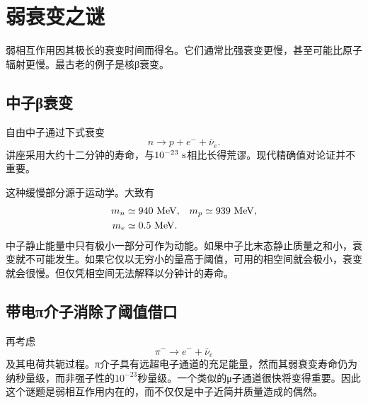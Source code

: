 \begin{classroomqa}
\end{classroomqa}

\begin{classroomqa}
\end{classroomqa}

\section{弱衰变之谜}

弱相互作用因其极长的衰变时间而得名。它们通常比强衰变更慢，甚至可能比原子辐射更慢。最古老的例子是核{\proseunicodefont β}衰变。

\subsection{中子{\proseunicodefont β}衰变}

自由中子通过下式衰变
\begin{equation}
n\longrightarrow p+e^-+\bar\nu_e.
\label{eq:l5-neutron-decay-intro}
\end{equation}
讲座采用大约十二分钟的寿命，与\(10^{-23}\ {\rm s}\)相比长得荒谬。现代精确值对论证并不重要。

这种缓慢部分源于运动学。大致有
\begin{equation}
\begin{aligned}
m_n&\simeq940\ {\rm MeV},
&
m_p&\simeq939\ {\rm MeV},
\\
m_e&\simeq0.5\ {\rm MeV}.
\end{aligned}
\end{equation}
中子静止能量中只有极小一部分可作为动能。如果中子比末态静止质量之和小，衰变就不可能发生。如果它仅以无穷小的量高于阈值，可用的相空间就会极小，衰变就会很慢。但仅凭相空间无法解释以分钟计的寿命。

\subsection{带电{\proseunicodefont π}介子消除了阈值借口}

再考虑
\begin{equation}
\pi^-\longrightarrow e^-+\bar\nu_e
\end{equation}
及其电荷共轭过程。{\proseunicodefont π}介子具有远超电子通道的充足能量，然而其弱衰变寿命仍为纳秒量级，而非强子性的\(10^{-23}\)秒量级。一个类似的{\proseunicodefont μ}子通道很快将变得重要。因此这个谜题是弱相互作用内在的，而不仅仅是中子近简并质量造成的偶然。

